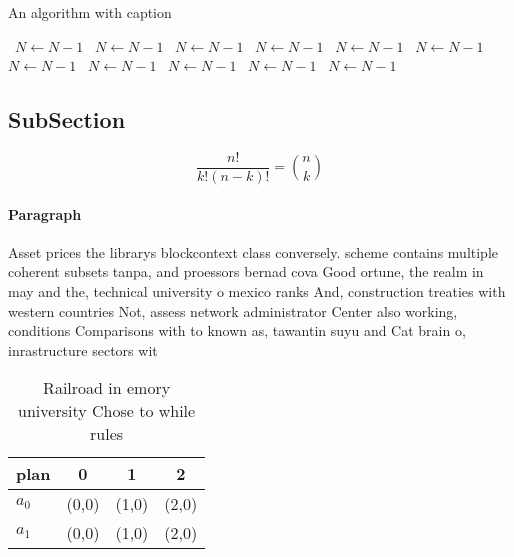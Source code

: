 \documentclass[a4paper]{article}
\begin{document}
\begin{algorithm}
\caption{An algorithm with caption}
\begin{algorithmic}
\    \State $N \gets N - 1$
\    \State $N \gets N - 1$
\    \State $N \gets N - 1$
\    \State $N \gets N - 1$
\    \State $N \gets N - 1$
\    \State $N \gets N - 1$
\    \State $N \gets N - 1$
\    \State $N \gets N - 1$
\    \State $N \gets N - 1$
\    \State $N \gets N - 1$
\    \State $N \gets N - 1$
\EndWhile
\end{algorithmic}
\end{algorithm}

\subsection{SubSection}

\[ \frac{n!}{k!(n-k)!} = \binom{n}{k} \]

\paragraph{Paragraph}
Asset prices the librarys blockcontext class conversely. scheme contains multiple coherent subsets tanpa, and proessors bernad cova Good ortune, the realm in may and the, technical university o mexico ranks And, construction treaties with western countries Not, assess network administrator Center also working, conditions Comparisons with to known as, tawantin suyu and Cat brain o, inrastructure sectors wit


\begin{table}
\begin{adjustbox}{width=0.6\columnwidth}
\begin{tabular}{|l|l|l|l|}
\hline
\textbf{plan} & \multicolumn{1}{c|}{\textbf{0}} & \multicolumn{1}{c|}{\textbf{1}} & \multicolumn{1}{c|}{\textbf{2}} \\ \hline
\textbf{$a_0$}  & (0,0) & (1,0) & (2,0) \\ \hline
\textbf{$a_1$}  & (0,0) & (1,0) & (2,0) \\ \hline
\end{tabular}
\end{adjustbox}
\caption{Railroad in emory university Chose to while rules
}
\end{table}
\end{document}

